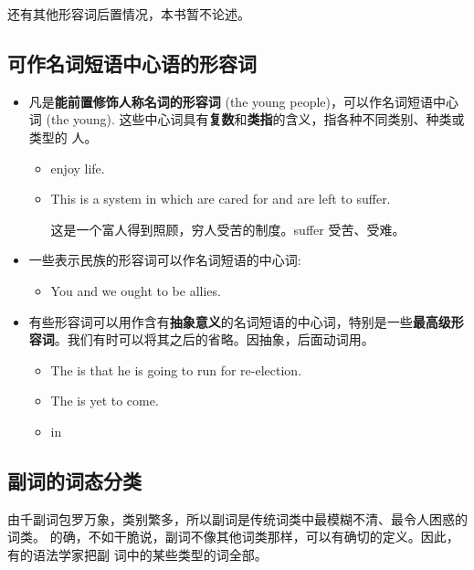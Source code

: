 还有其他形容词后置情况，本书暂不论述。

\subsection{可作名词短语中心语的形容词}
\begin{itemize}
\item 凡是\textbf{能前置修饰人称名词的形容词} (the young people)，可以作名词短语中心
  词 (the young). 这些中心词具有\textbf{复数}和\textbf{类指}的含义，指各种不同类别、种类或类型的
  人。
  \begin{itemize}
  \item {} enjoy life.

  \item This is a system in which  are cared for and
     are left to suffer.

    这是一个富人得到照顾，穷人受苦的制度。suffer  受苦、受难。
  \end{itemize}
\item 一些表示民族的形容词可以作名词短语的中心词:
  \begin{itemize}
  \item You  and we  ought to be allies.
  \end{itemize}
\item 有些形容词可以用作含有\textbf{抽象意义}的名词短语的中心词，特别是一些\textbf{最高级形
    容词}。我们有时可以将其之后的省略。因抽象，后面动词用。
  \begin{itemize}
  \item The  is that he is going to run for re-election.

  \item The  is yet to come.

  \item in 
  \end{itemize}

\end{itemize}

\subsection{副词的词态分类}

由千副词包罗万象，类别繁多，所以副词是传统词类中最模糊不清、最令人困惑的词类。
的确，不如干脆说，副词不像其他词类那样，可以有确切的定义。因此，有的语法学家把副
词中的某些类型的词全部。

